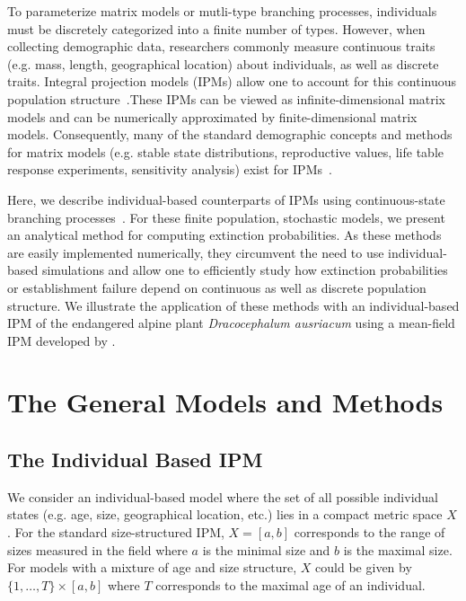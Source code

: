 \documentclass[12pt]{amsart}\usepackage[]{graphicx}\usepackage[]{color}
\begin{document}
To parameterize matrix models or mutli-type branching processes, individuals must be discretely categorized into a finite number of types. However, when collecting demographic data, researchers commonly measure continuous traits (e.g. mass, length, geographical location) about individuals, as well as discrete traits. Integral projection models (IPMs) allow one to account for this continuous population structure~\citep{easterling-etal-00}.These IPMs can be viewed as infinite-dimensional matrix models and can be numerically approximated by finite-dimensional matrix models. Consequently, many of the standard demographic concepts and methods for matrix models (e.g. stable state distributions, reproductive values, life table response experiments, sensitivity analysis) exist for IPMs~\citep{easterling-etal-00,rees-ellner-09,coulson-12,metcalf-etal-13,rees-etal-14,merow-etal-14}.

Here, we describe individual-based counterparts of IPMs using continuous-state branching processes~\citep{harris-63}. For these finite population, stochastic models, we present an analytical method for computing extinction probabilities. As these methods are easily implemented numerically, they circumvent the need to use individual-based simulations and allow one to efficiently study how extinction probabilities or establishment failure depend on continuous as well as discrete population structure. We illustrate the application of these methods with an individual-based IPM of the endangered alpine plant \emph{Dracocephalum ausriacum} using a mean-field IPM developed by \citet{nicole-etal-11}.


\section*{The General Models and Methods}


\subsection*{The Individual Based IPM}
We consider an individual-based model where the set of all possible individual states (e.g. age, size, geographical location, etc.) lies in a compact metric space $X$. For the standard size-structured IPM, $X=[a,b]$ corresponds to the range of sizes measured in the field where $a$ is the minimal size and $b$ is the maximal size. For models with a mixture of age and size structure, $X$ could be given by $\{1,\dots,T\}\times [a,b]$ where $T$ corresponds to the maximal age of an individual.
\end{document}
